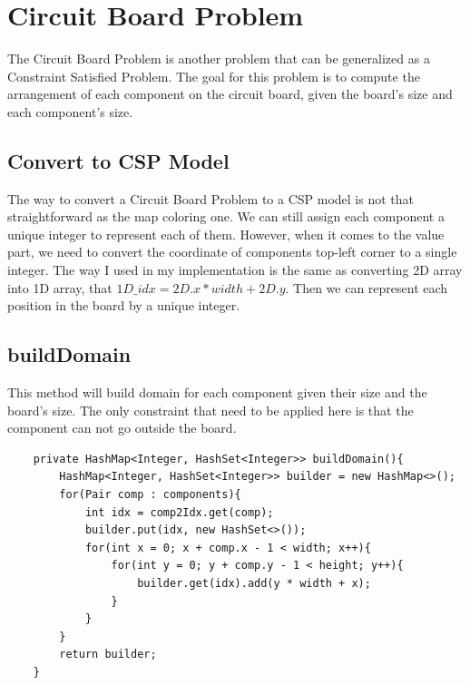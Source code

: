 \documentclass{article}
\begin{document}
\section{Circuit Board Problem}
The Circuit Board Problem is another problem that can be generalized as a Constraint Satisfied Problem. The goal for this problem is to compute the arrangement of each component on the circuit board, given the board's size and each component's size.
\subsection{Convert to CSP Model}
The way to convert a Circuit Board Problem to a CSP model is not that straightforward as the map coloring one. We can still assign each component a unique integer to represent each of them. However, when it comes to the value part, we need to convert the coordinate of components top-left corner to a single integer. The way I used in my implementation is the same as converting 2D array into 1D array, that $1D\_idx = 2D.x * width + 2D.y$. Then we can represent each position in the board by a unique integer.

\subsection{buildDomain}
This method will build domain for each component given their size and the board's size. The only constraint that need to be applied here is that the component can not go outside the board.
\begin{lstlisting}
	private HashMap<Integer, HashSet<Integer>> buildDomain(){
		HashMap<Integer, HashSet<Integer>> builder = new HashMap<>();
		for(Pair comp : components){
			int idx = comp2Idx.get(comp);
			builder.put(idx, new HashSet<>());
			for(int x = 0; x + comp.x - 1 < width; x++){
				for(int y = 0; y + comp.y - 1 < height; y++){
					builder.get(idx).add(y * width + x);
				}
			}
		}
		return builder;
	}
\end{lstlisting}
\end{document}
